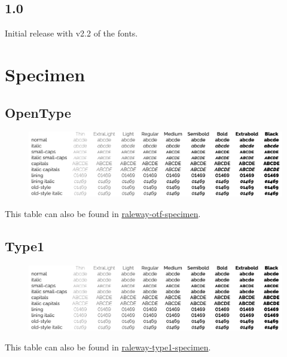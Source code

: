 \documentclass[10pt,a4paper,english]{article}
\newcommand*\file[1]{\href{run:#1.pdf}{#1}}
\begin{document}
\begin{multicols}{2}
\subsection*{1.0}
\begin{itemize*}
	\item Initial release with v2.2 of the fonts.
\end{itemize*}


\vspace{0pt plus 1filll}\mbox{}
\newpage
\end{multicols}

\section{Specimen}
\label{sec:specimen}
\subsection{OpenType}
\begin{figure}[ht]
	\centering
	\includegraphics[width=\textwidth]{raleway-otf-specimen}
\end{figure}
This table can also be found in \file{raleway-otf-specimen}.

\subsection{Type1}
\begin{figure}[ht]
	\centering
	\includegraphics[width=\textwidth]{raleway-type1-specimen}
\end{figure}
This table can also be found in \file{raleway-type1-specimen}.
\end{document}
